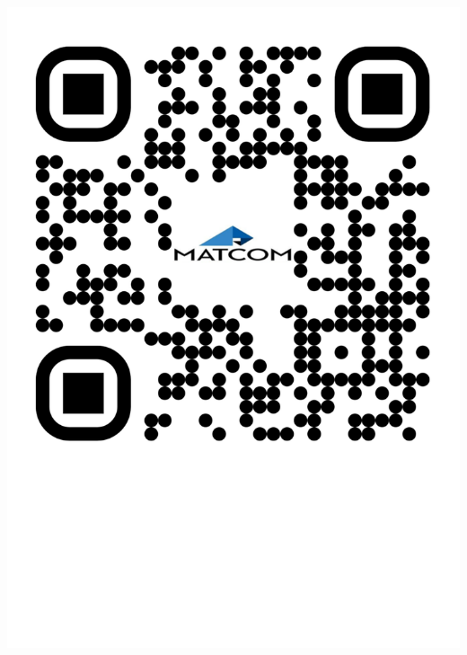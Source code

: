 \documentclass[10pt,twoside]{rcmart} %
\begin{document}

% 

% 



\begingroup
	\let\clearpage\relax 
	\begin{flushright}
		\includegraphics[scale=0.12]{qrcode.pdf}
	\end{flushright}
\end{document}
